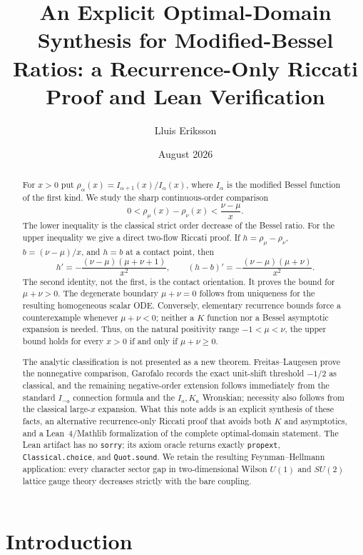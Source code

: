 \documentclass[11pt]{article}
\title{An Explicit Optimal-Domain Synthesis for Modified-Bessel Ratios:
a Recurrence-Only Riccati Proof and Lean Verification}
\author{Lluis Eriksson}
\date{August 2026}
\theoremstyle{remark}
\begin{document}
\maketitle

\begin{abstract}
For $x>0$ put $\rho_\alpha(x)=I_{\alpha+1}(x)/I_\alpha(x)$, where
$I_\alpha$ is the modified Bessel function of the first kind.  We study
the sharp continuous-order comparison
\[
  0<\rho_\mu(x)-\rho_\nu(x)<\frac{\nu-\mu}{x}.
\]
The lower inequality is the classical strict order decrease of the
Bessel ratio.  For the upper inequality we give a direct two-flow
Riccati proof.  If $h=\rho_\mu-\rho_\nu$, $b=(\nu-\mu)/x$, and
$h=b$ at a contact point, then
\[
 h'=-\frac{(\nu-\mu)(\mu+\nu+1)}{x^2},\qquad
 (h-b)'=-\frac{(\nu-\mu)(\mu+\nu)}{x^2}.
\]
The second identity, not the first, is the contact orientation.  It
proves the bound for $\mu+\nu>0$.  The degenerate boundary
$\mu+\nu=0$ follows from uniqueness for the resulting homogeneous
scalar ODE.  Conversely, elementary recurrence bounds force a
counterexample whenever $\mu+\nu<0$; neither a $K$ function nor a
Bessel asymptotic expansion is needed.
Thus, on the natural positivity range $-1<\mu<\nu$, the upper bound
holds for every $x>0$ if and only if $\mu+\nu\ge0$.

The analytic classification is not presented as a new theorem.
Freitas--Laugesen prove the nonnegative comparison, Garofalo records
the exact unit-shift threshold $-1/2$ as classical, and the remaining
negative-order extension follows immediately from the standard
$I_{-a}$ connection formula and the $I_a,K_a$ Wronskian; necessity
also follows from the classical large-$x$ expansion.  What this note
adds is an explicit synthesis of these facts, an alternative
recurrence-only Riccati proof that avoids both $K$ and asymptotics,
and a Lean~4/Mathlib formalization of the complete optimal-domain
statement.  The Lean
artifact has no \texttt{sorry}; its axiom oracle returns exactly
\texttt{propext}, \texttt{Classical.choice}, and \texttt{Quot.sound}.
We retain the resulting Feynman--Hellmann application: every character
sector gap in two-dimensional Wilson $U(1)$ and $SU(2)$ lattice gauge
theory decreases strictly with the bare coupling.
\end{abstract}

\section{Introduction}
\end{document}
